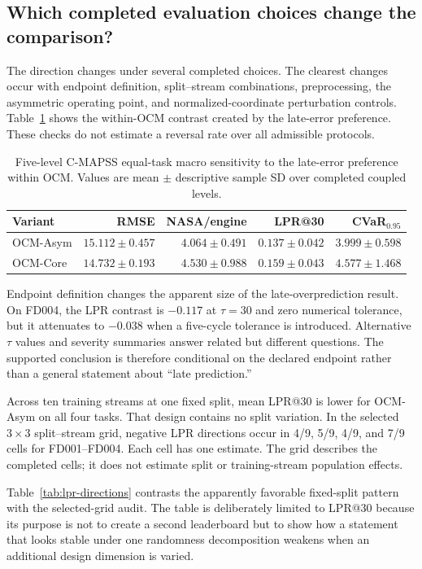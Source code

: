 \documentclass[preprint,12pt,numbers,sort&compress]{elsarticle}
\begin{document}
\subsection{Which completed evaluation choices change the comparison?}

The direction changes under several completed choices. The clearest changes occur with endpoint definition, split--stream combinations, preprocessing, the asymmetric operating point, and normalized-coordinate perturbation controls. Table~\ref{tab:core-asym} shows the within-OCM contrast created by the late-error preference. These checks do not estimate a reversal rate over all admissible protocols.

\begin{table}[!t]
\centering
\caption{Five-level C-MAPSS equal-task macro sensitivity to the late-error preference within OCM. Values are mean $\pm$ descriptive sample SD over completed coupled levels.}
\label{tab:core-asym}
\scriptsize
\setlength{\tabcolsep}{4pt}
\begin{tabular}{@{}lrrrr@{}}
\toprule
Variant & RMSE & NASA/engine & LPR@30 & CVaR$_{0.95}$ \\
\midrule
OCM-Asym & $15.112\pm0.457$ & $4.064\pm0.491$ & $0.137\pm0.042$ & $3.999\pm0.598$ \\
OCM-Core & $14.732\pm0.193$ & $4.530\pm0.988$ & $0.159\pm0.043$ & $4.577\pm1.468$ \\
\bottomrule
\end{tabular}
\end{table}
\FloatBarrier

Endpoint definition changes the apparent size of the late-overprediction result. On FD004, the LPR contrast is $-0.117$ at $\tau=30$ and zero numerical tolerance, but it attenuates to $-0.038$ when a five-cycle tolerance is introduced. Alternative $\tau$ values and severity summaries answer related but different questions. The supported conclusion is therefore conditional on the declared endpoint rather than a general statement about ``late prediction.''

Across ten training streams at one fixed split, mean LPR@30 is lower for OCM-Asym on all four tasks. That design contains no split variation. In the selected $3\times3$ split--stream grid, negative LPR directions occur in 4/9, 5/9, 4/9, and 7/9 cells for FD001--FD004. Each cell has one estimate. The grid describes the completed cells; it does not estimate split or training-stream population effects.

Table~\ref{tab:lpr-directions} contrasts the apparently favorable fixed-split pattern with the selected-grid audit. The table is deliberately limited to LPR@30 because its purpose is not to create a second leaderboard but to show how a statement that looks stable under one randomness decomposition weakens when an additional design dimension is varied.
\end{document}
